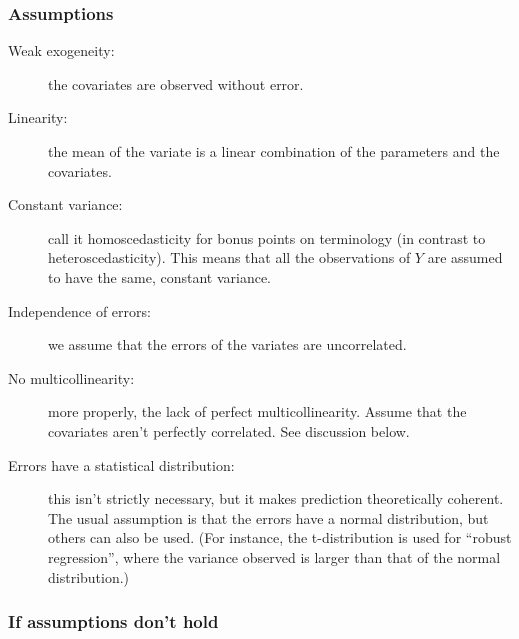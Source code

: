 \documentclass[a4paper]{article}
\begin{document}
\subsubsection{Assumptions}
\begin{description}
  \item[Weak exogeneity:] the covariates are observed without error.
  \item[Linearity:] the mean of the variate is a linear combination of the parameters and the covariates.
  \item[Constant variance:] call it homoscedasticity for bonus points on terminology (in contrast to heteroscedasticity).
  This means that all the observations of $Y$ are assumed to have the same, constant variance.
  \item[Independence of errors:] we assume that the errors of the variates are uncorrelated.
  \item[No multicollinearity:] more properly, the lack of perfect multicollinearity. Assume that the covariates aren't perfectly correlated. See discussion below.
  \item[Errors have a statistical distribution:] this isn't strictly necessary, but it makes prediction theoretically coherent. The usual assumption is that the errors have a normal distribution, but others can also be used.
  (For instance, the t-distribution is used for ``robust regression'', where the variance observed is larger than that of the normal distribution.)
\end{description}



\subsubsection{If assumptions don't hold}
\end{document}
